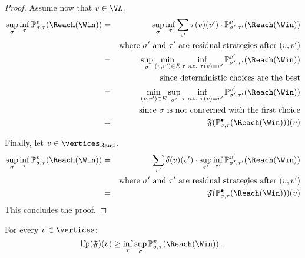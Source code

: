 \begin{proof}
    Assume now that $v \in \VA$. 
    \begin{eqnarray*}
      \sup_\sigma \inf_\tau \probm_{\sigma,\tau}^v(\Reach(\Win)) & = &
      \sup_\sigma \inf_\tau \sum_{v'} \tau(v)(v')
      \cdot \probm_{\sigma',\tau'}^{v'}(\Reach(\Win)) \\
      & & \text{where}\ \sigma'\ \text{and}\ \tau'\ \text{are residual
        strategies after}\ (v,v') \\
      & = & \sup_\sigma \min_{(v,v') \in E} \inf_{\tau\
        \text{s.t.}\ \tau(v) = v'} 
       \probm_{\sigma',\tau'}^{v'}(\Reach(\Win)) \\
      & & \text{since deterministic choices are the best} \\
      & = & \min_{(v,v') \in E}  \sup_{\sigma'} \inf_{\tau\
        \text{s.t.}\ \tau(v) = v'} \probm_{\sigma',\tau'}^{v'}(\Reach(\Win)) \\
      & & \text{since}\ \sigma\ \text{is not concerned with the first
        choice} \\
      & = & \mathfrak{F}(\probm_{\sigma,\tau}^{\bullet}(\Reach(\Win)))(v)
    \end{eqnarray*}

    Finally, let  $v \in \Randomvertices$. 
    \begin{eqnarray*}
      \sup_\sigma \inf_\tau \probm_{\sigma,\tau}^v(\Reach(\Win)) & = & \sum_{v'} \delta(v)(v') \cdot \sup_{\sigma'} \inf_{\tau'} \probm_{\sigma',\tau'}^{v'}(\Reach(\Win))\\
            & & \text{where}\ \sigma'\ \text{and}\ \tau'\ \text{are residual
                strategies after}\ (v,v') \\
      & = & \mathfrak{F}(\probm_{\sigma,\tau}^{\bullet}(\Reach(\Win)))(v)
    \end{eqnarray*}
    This concludes the proof.
    
  \end{proof}

  \begin{lemma}
    \label{6-lem:lfpleval}
    For every $v \in \vertices$:
    \[
    \lfp(\mathfrak{F})(v) \ge \inf_\tau \sup_\sigma
    \probm_{\sigma,\tau}^v(\Reach(\Win)) \enspace.
    \]
  \end{lemma}

